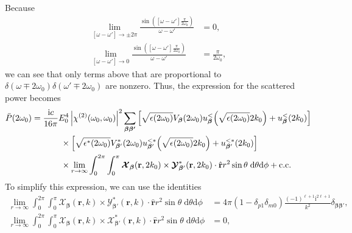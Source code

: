 \documentclass{article}
\begin{document}
Because
\begin{equation}
\begin{split}
\lim_{[\omega - \omega']\to\pm2\pi}\frac{\sin([\omega - \omega']\frac{\pi}{2\omega_0})}{\omega - \omega'} &= 0,\\
\lim_{[\omega - \omega']\to0}\frac{\sin([\omega - \omega']\frac{\pi}{2\omega_0})}{\omega - \omega'} &= \frac{\pi}{2\omega_0},
\end{split}
\end{equation}
we can see that only terms above that are proportional to $\delta(\omega\mp2\omega_0)\delta(\omega'\mp2\omega_0)$ are nonzero. Thus, the expression for the scattered power becomes
\begin{equation}
\begin{split}
\bar{P}(2\omega_0) &= \frac{\mathrm{i}c}{16\pi}E_0^4\left|\chi^{(2)}(\omega_0,\omega_0)\right|^2\sum_{\bm{\beta}\bm{\beta'}}\left[\sqrt{\epsilon(2\omega_0)}V_{\bm{\beta}}(2\omega_0)u_{\bm{\beta}}^<\!\left(\sqrt{\epsilon(2\omega_0)}2k_0\right) + u_{\bm{\beta}}^<(2k_0)\right]\\ 
&\hspace{0.1\textwidth}\times\left[\sqrt{\epsilon^*(2\omega_0)}V_{\bm{\beta}'}^*(2\omega_0)u_{\bm{\beta}'}^{<*}\!\left(\sqrt{\epsilon(2\omega_0)}2k_0\right) + u_{\bm{\beta}'}^{<*}(2k_0)\right]\\
&\hspace{0.1\textwidth}\times\lim_{r\to\infty}\int_0^{2\pi}\int_0^\pi\bm{\mathcal{X}}_{\bm{\beta}}(\mathbf{r},2k_0)\times\bm{\mathcal{Y}}_{\bm{\beta}'}^*(\mathbf{r},2k_0)\cdot\hat{\mathbf{r}}r^2\sin\theta\;\mathrm{d}\theta\mathrm{d}\phi + \mathrm{c.c.}
\end{split}
\end{equation}
To simplify this expression, we can use the identities
\begin{equation}
\begin{split}
\lim_{r\to\infty}\int_0^{2\pi}\int_0^\pi\bm{\mathcal{X}}_{\bm{\beta}}(\mathbf{r},k)\times\bm{\mathcal{Y}}_{\bm{\beta}'}^*(\mathbf{r},k)\cdot\hat{\mathbf{r}}r^2\sin\theta\;\mathrm{d}\theta\mathrm{d}\phi &= 4\pi(1 - \delta_{p1}\delta_{m0})\frac{(-1)^{\ell + 1}\mathrm{i}^{2\ell + 1}}{k^2}\delta_{\bm{\beta}\bm{\beta}'},\\
\lim_{r\to\infty}\int_0^{2\pi}\int_0^\pi\bm{\mathcal{X}}_{\bm{\beta}}(\mathbf{r},k)\times\bm{\mathcal{X}}_{\bm{\beta}'}^*(\mathbf{r},k)\cdot\hat{\mathbf{r}}r^2\sin\theta\;\mathrm{d}\theta\mathrm{d}\phi &= 0,
\end{split}
\end{equation}
\end{document}
